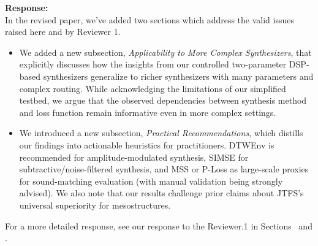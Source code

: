 \documentclass[11pt]{article}
\begin{document}
\noindent\textbf{Response:} \\
In the revised paper, we've added two sections which address the valid issues raised here and by Reviewer 1. 

\begin{itemize}
  \item We added a new subsection, \emph{Applicability to More Complex Synthesizers}, that explicitly discusses how the insights from our controlled two-parameter DSP-based synthesizers generalize to richer synthesizers with many parameters and complex routing. While acknowledging the limitations of our simplified testbed, we argue that the observed dependencies between synthesis method and loss function remain informative even in more complex settings.
  \item We introduced a new subsection, \emph{Practical Recommendations}, which distills our findings into actionable heuristics for practitioners. DTWEnv is recommended for amplitude-modulated synthesis, SIMSE for subtractive/noise-filtered synthesis, and MSS or P-Loss as large-scale proxies for sound-matching evaluation (with manual validation being strongly advised). We also note that our results challenge prior claims about JTFS’s universal superiority for mesostructures.

\end{itemize}

For a more detailed response, see our response to the Reviewer.1 in Sections~ and .




\end{document}
